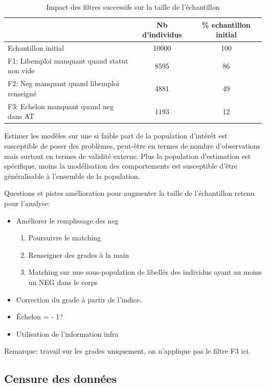 \documentclass[11pt,a4paper]{article}
\begin{document}
\begin{table}[h!]
\centering
\caption{Impact des filtres successifs sur la taille de l'échantillon} 
\label{filters}
\begin{tabular}{lcc}
\toprule
 & Nb d'individus & \% echantillon initial \\ 
  \hline
Echantillon initial & 10000 & 100 \\ 
F1: Libemploi manquant quand statut non vide & 8595 & 86 \\ 
  F2: Neg manquant quand libemploi renseigné & 4881 & 49 \\ 
  F3: Echelon manquant quand neg dans AT & 1193 & 12 \\ 
\bottomrule
\end{tabular}
\end{table}


Estimer les modèles sur une si faible part de la population d'intérêt est susceptible de poser des problèmes, peut-être en termes de nombre d'observations mais surtout en termes de validité externe. Plus la population d'estimation est spécifique, moins la modélisation des comportements est susceptible d'être généralisable à l'ensemble de la population. 


Questions et pistes amélioration pour augmenter la taille de l'échantillon retenu pour l'analyse: 
\begin{itemize}[leftmargin=1cm ,parsep=0cm,itemsep=0cm,topsep=0cm] 
\item Améliorer le remplissage des neg 
	\begin{enumerate}[leftmargin=1cm ,parsep=0cm,itemsep=0cm,topsep=0cm] 
	\item Poursuivre le matching
	\item Renseigner des grades à la main 
	\item Matching sur une sous-population de libellés des individus ayant au moins un NEG dans le corps
	\end{enumerate}
\item Correction du grade à partir de l'indice. 
\item Échelon = - 1?
\item Utilisation de l'information infra
\end{itemize}


Remarque: travail sur les grades uniquement, on n'applique pas le filtre F3 ici. 


\subsection{Censure des données}
\end{document}
